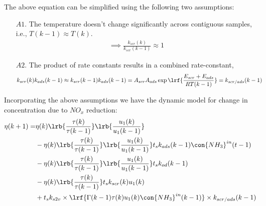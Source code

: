 The above equation can be simplified using the following two assumptions:
\begin{itemize}
        \item[$A1.$] The temperature doesn't change significantly across contiguous samples, i.e., $T(k-1) \approx T(k)$.
        \begin{align}
                \implies \frac{k_{scr}(k)}{k_{scr}(k-1)} \approx 1
        \end{align}
        \item[$A2.$] The product of rate constants results in a combined rate-constant,
        \begin{align}
                k_{scr}(k) k_{ads}(k-1) &\approx k_{scr}(k-1) k_{ads}(k-1)  = A_{scr}A_{ads} \exp\lrf{\frac{E_{scr}+E_{ads}}{R T(k-1)}} = k_{scr/ads}(k-1)
        \end{align}
\end{itemize}
Incorporating the above assumptions we have the dynamic model for change in concentration due to $NO_x$ reduction:
\begin{align*}
         \eta(k+1) =& \eta(k) \lrb{\frac{\tau(k)}{\tau(k-1)}}
                                \lrb{\frac{u_1(k)}{u_1(k-1)}}
                \\
                &-\eta(k) \lrb{\frac{\tau(k)}{\tau(k-1)}}
                                \lrb{\frac{u_1(k)}{u_1(k-1)}}
                t_s k_{ads}(k-1) \con{NH_3}^{in}(t-1)
                \\
                &-\eta(k) \lrb{\frac{\tau(k)}{\tau(k-1)}}
                                \lrb{\frac{u_1(k)}{u_1(k-1)}}
                t_s k_{od}(k-1)
                \\
                &-\eta(k) \lrb{\frac{\tau(k)}{\tau(k-1)}}
                t_s k_{scr}(k) u_1(k)
                \\
                &+ t_s k_{s2v} \times \lrf{\Gamma(k-1) \tau(k) u_1(k)\con{NH_3}^{in}(k-1)} \times k_{scr/ads}(k-1)
\end{align*}
\begin{equation}
       \label{eqn::nox_govern}
\end{equation}
